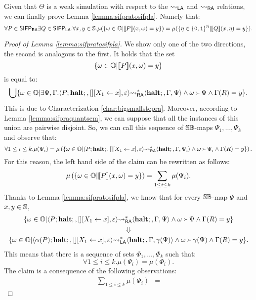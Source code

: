 \noindent
Given that $\Theta$ is a weak simulation with respect to the ${\leadsto_{\mathsf{LA}}}$ and
${\leadsto_{\mathsf{RA}}}$ relations, we can finally prove Lemma \ref{lemma:sifpratosifpla}.
Namely that:
\small
$$
\forall P \in \mathsf{SIFP_{{\mathsf{RA}}}}\exists Q \in \mathsf{SIFP_{{\mathsf{LA}}}}.\forall x, y \in \mathbb{S}.
\mu(\{\omega \in \mathbb{O} |\llbracket P\rrbracket (x, \omega)= y\})= \mu(\{\eta \in \{\mathtt{0}, \mathtt{1}\}^{\mathbb{N}} |\llbracket Q\rrbracket (x, \eta)= y\}).
$$
\normalsize
\begin{proof}[Proof of Lemma \ref{lemma:sifpratosifpla}]
  We show only one of the two directions, the second is analogous to the first.
  It holds that the set
  $$
    \{\omega \in \mathbb{O} |\llbracket P\rrbracket (x, \omega)= y\}
  $$
  is equal to:
  $$
  \bigcup \{\omega \in \mathbb{O} |\exists \Psi, \Gamma.\langle P;\mathbf{halt};, [][X_1 \leftarrow x], \varepsilon\rangle{\leadsto_{\mathsf{RA}}^{*}}\langle\mathbf{halt};, \Gamma, \Psi\rangle \land \omega \Yright \Psi\land \Gamma(R)=y\}.
  $$
  This is due to Characterization \ref{char:bigsmallstepra}.
  Moreover, according to Lemma \ref{lemma:sifpraquantsem},
  we can suppose that all the instances of this union
  are pairwise disjoint.
  So, we can call this sequence of $\mathbb{S}\mathbb{B}$-maps $\Psi_1, \ldots, \Psi_k$
  and observe that:
  $$
  \forall 1 \le i\le k. \mu(\Psi_i) = \mu \left(\{\omega \in \mathbb{O} |\langle P;\mathbf{halt};, [][X_1 \leftarrow x], \varepsilon\rangle{\leadsto_{\mathsf{RA}}^{*}}\langle\mathbf{halt};, \Gamma, \Psi_i\rangle \land \omega \Yright \Psi_i\land \Gamma(R)=y\}\right).
  $$
  For this reason, the left hand side of the claim can be rewritten as follows:
  $$
  \mu\left(\{\omega \in \mathbb{O} |\llbracket P\rrbracket (x, \omega)= y\}\right) = \sum_{1 \le i \le k} \mu(\Psi_i).
  $$
  Thanks to Lemma \ref{lemma:sifpratosifpla}, we know that for every $\mathbb{S}\mathbb{B}$-map $\Psi$ and $x, y \in \mathbb{S}$,
  $$
  \begin{gathered}
  \{\omega \in \mathbb{O} |\langle P;\mathbf{halt};, [][X_1 \leftarrow x], \varepsilon\rangle{\leadsto_{\mathsf{RA}}^{*}}\langle\mathbf{halt};, \Gamma, \Psi\rangle \land \omega \Yright \Psi\land \Gamma(R)=y\}\\
  \Downarrow\\
  \{\omega \in \mathbb{O} |\langle \alpha(P);\mathbf{halt};, [][X_1 \leftarrow x], \varepsilon\rangle{\leadsto_{\mathsf{LA}}^{*}}\langle\mathbf{halt};, \Gamma, \gamma(\Psi)\rangle \land \omega \Yright \gamma(\Psi)\land \Gamma(R)=y\}.
\end{gathered}
  $$
  This means that there is a sequence of sets $\Phi_1, \ldots, \Phi_k$ such that:
  $$
  \forall 1 \le i \le k. \mu(\Psi_i)=\mu(\Phi_i).
  $$
  The claim is a consequence of the following observations:
  \footnotesize
  \begin{align*}
  \sum_{1 \le i \le k} \mu(\Phi_i) &=

\end{align*}
\end{proof}
